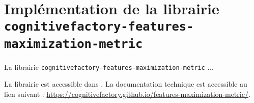\section{Implémentation de la librairie \\ \texttt{cognitivefactory-features-maximization-metric}}
\label{annex:C.3-DESCRIPTION-IMPLEMENTATION-FEATURES-MAXIMIZATION-METRIC}
	
	La librairie \texttt{cognitivefactory-features-maximization-metric} ...
	
	\begin{leftBarInformation}
		La librairie est accessible dans \cite{schild:2023:cognitivefactory-featuresmaximizationmetric}.
		La documentation technique est accessible au lien suivant : \url{https://cognitivefactory.github.io/features-maximization-metric/}.
	\end{leftBarInformation}